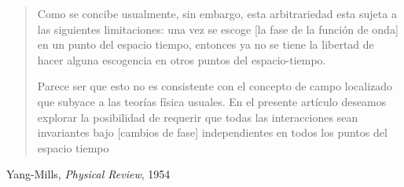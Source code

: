 \documentclass[%
xcolor=pdftex,dvipsnames,table%
]{beamer}
\begin{document}
{
\begin{frame}[plain]


\begin{block}{}
  \begin{quote}
    Como se concibe usualmente, sin embargo, esta arbitrariedad esta sujeta a las siguientes limitaciones: una vez se escoge [la fase de la función de onda] en un punto del espacio tiempo, entonces ya no se tiene la libertad de hacer alguna escogencia en otros puntos del espacio-tiempo.

Parece ser que esto no es consistente con el concepto de campo localizado que subyace a las teorías física usuales. En el presente artículo deseamos explorar la posibilidad de requerir que todas las interacciones sean invariantes bajo [cambios de fase] independientes en todos los puntos del espacio tiempo
  \end{quote}
  \begin{flushright}
    Yang-Mills, \emph{Physical Review}, 1954
  \end{flushright}
\end{block}
\end{frame}
}
\end{document}

